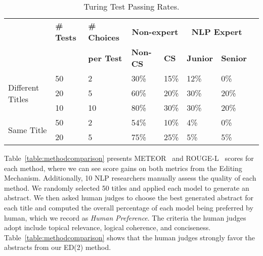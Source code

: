 \documentclass[11pt,a4paper]{article}
\begin{document}
\begin{table*}[!htbp]
\centering
\footnotesize
\begin{tabular}{|p{2.3cm}<{\centering}|p{1.2cm}<{\centering}|p{1.6cm}<{\centering}|p{1.6cm}<{\centering}|p{1.3cm}<{\centering}|p{1.6cm}<{\centering}|p{1.4cm}<{\centering}|p{1cm}<{\centering}|}
\hline
                                  & \textbf{\# Tests} & \textbf{\# Choices} & \multicolumn{2}{c|}{\textbf{Non-expert}}         & \multicolumn{2}{c|}{\textbf{NLP Expert}}            \\ \cline{4-7} 
                                  &                   & \textbf{per Test}   & \textbf{\textbf{Non-CS}} & \textbf{\textbf{CS}} & \textbf{\textbf{Junior}} & \textbf{\textbf{Senior}} \\ \hline
\multirow{3}{*}{Different Titles} & 50                & 2                   & 30\%                     & 15\%                 & 12\%                     & 0\%                      \\ \cline{2-7} 
                                  & 20                & 5                   & 60\%                     & 20\%                 & 30\%                     & 20\%                     \\ \cline{2-7} 
                                  & 10                & 10                  & 80\%                     & 30\%                 & 30\%                     & 20\%                     \\ \hline
\multirow{2}{*}{Same Title}       & 50                & 2                   & 54\%                     & 10\%                 & 4\%                      & 0\%                      \\ \cline{2-7} 
                                  & 20                & 5                   & 75\%                     & 25\%                 & 5\%                      & 5\%                      \\ \hline
\end{tabular}
\caption{\label{table:hresults} Turing Test Passing Rates.}
\end{table*}

Table~\ref{table:methodcomparison} presents METEOR~\citep{denkowski2014meteor} and ROUGE-L~\citep{lin2004rouge} scores for each method, where we can see score gains on both metrics from the Editing Mechanism.  Additionally, 10 NLP researchers manually assess the quality of each method. We randomly selected 50 titles and applied each model to generate an abstract. We then asked human judges to choose the best generated abstract for each title and computed the overall percentage of each model being preferred by human, which we record as \emph{Human Preference}. The criteria the human judges adopt include topical relevance, logical coherence, and conciseness. Table~\ref{table:methodcomparison} shows that the human judges strongly favor the abstracts from our ED(2) method. 
\end{document}
